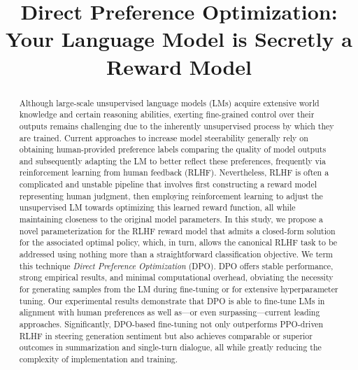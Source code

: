 \title{Direct Preference Optimization: Your Language Model is Secretly a Reward Model}

\begin{abstract}
Although large-scale unsupervised language models (LMs) acquire extensive world knowledge and certain reasoning abilities, exerting fine-grained control over their outputs remains challenging due to the inherently unsupervised process by which they are trained. Current approaches to increase model steerability generally rely on obtaining human-provided preference labels comparing the quality of model outputs and subsequently adapting the LM to better reflect these preferences, frequently via reinforcement learning from human feedback (RLHF). Nevertheless, RLHF is often a complicated and unstable pipeline that involves first constructing a reward model representing human judgment, then employing reinforcement learning to adjust the unsupervised LM towards optimizing this learned reward function, all while maintaining closeness to the original model parameters. In this study, we propose a novel parameterization for the RLHF reward model that admits a closed-form solution for the associated optimal policy, which, in turn, allows the canonical RLHF task to be addressed using nothing more than a straightforward classification objective. We term this technique \textit{Direct Preference Optimization} (DPO). DPO offers stable performance, strong empirical results, and minimal computational overhead, obviating the necessity for generating samples from the LM during fine-tuning or for extensive hyperparameter tuning. Our experimental results demonstrate that DPO is able to fine-tune LMs in alignment with human preferences as well as—or even surpassing—current leading approaches. Significantly, DPO-based fine-tuning not only outperforms PPO-driven RLHF in steering generation sentiment but also achieves comparable or superior outcomes in summarization and single-turn dialogue, all while greatly reducing the complexity of implementation and training. 
\end{abstract}

